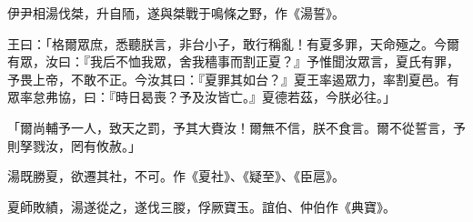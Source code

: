 
\begin{pinyinscope}
伊尹相湯伐桀，升自陑，遂與桀戰于鳴條之野，作《湯誓》。

王曰：「格爾眾庶，悉聽朕言，非台小子，敢行稱亂！有夏多罪，天命殛之。今爾有眾，汝曰：『我后不恤我眾，舍我穡事而割正夏？』予惟聞汝眾言，夏氏有罪，予畏上帝，不敢不正。今汝其曰：『夏罪其如台？』夏王率遏眾力，率割夏邑。有眾率怠弗協，曰：『時日曷喪？予及汝皆亡。』夏德若茲，今朕必往。」

「爾尚輔予一人，致天之罰，予其大賚汝！爾無不信，朕不食言。爾不從誓言，予則孥戮汝，罔有攸赦。」

湯既勝夏，欲遷其社，不可。作《夏社》、《疑至》、《臣扈》。

夏師敗績，湯遂從之，遂伐三朡，俘厥寶玉。誼伯、仲伯作《典寶》。


\end{pinyinscope}